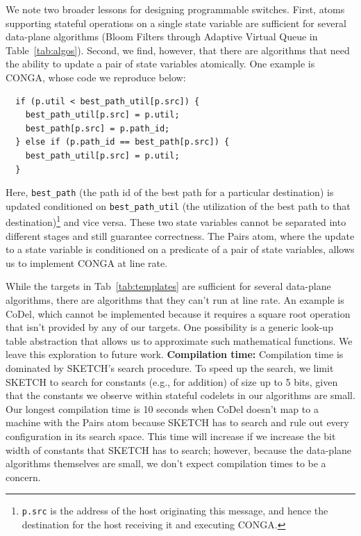 We note two broader lessons for designing programmable switches.  First,
atoms supporting stateful operations on a single state variable are sufficient
for several data-plane algorithms (Bloom Filters through Adaptive Virtual Queue
in Table~\ref{tab:algos}). Second, we find, however, that there are algorithms
that need the ability to update a pair of state variables atomically. One
example is CONGA, whose code we reproduce below:
\begin{verbatim}
  if (p.util < best_path_util[p.src]) {
    best_path_util[p.src] = p.util;
    best_path[p.src] = p.path_id;
  } else if (p.path_id == best_path[p.src]) {
    best_path_util[p.src] = p.util;
  }
\end{verbatim}
Here, \texttt{best\_path} (the path id of the best path for a particular
destination) is updated conditioned on \texttt{best\_path\_util} (the
utilization of the best path to that destination)\footnote{{\tt p.src} is the
  address of the host originating this message, and hence the destination for
the host receiving it and executing CONGA.} and vice versa. These two state
variables cannot be separated into different stages and still guarantee
correctness. The Pairs atom, where the update to a state variable is
conditioned on a predicate of a pair of state variables, allows us to implement
CONGA at line rate.

While the targets in Tab~\ref{tab:templates} are sufficient for several
data-plane algorithms, there are algorithms that they can't run at line rate.
An example is CoDel, which cannot be implemented because it requires a square
root operation that isn't provided by any of our targets. One possibility is a
generic look-up table abstraction that allows us to approximate such
mathematical functions. We leave this exploration to future work.
\textbf{Compilation time:}
Compilation time is dominated by SKETCH's search procedure.  To speed up the
search, we limit SKETCH to search for constants (e.g., for addition) of size up
to 5 bits, given that the constants we observe within stateful codelets in our
algorithms are small. Our longest compilation time is 10 seconds when CoDel
doesn't map to a \absmachine machine with the Pairs atom because SKETCH has to
search and rule out every configuration in its search space.  This time will
increase if we increase the bit width of constants that SKETCH has to search;
however, because the data-plane algorithms themselves are small, we don't
expect compilation times to be a concern.

